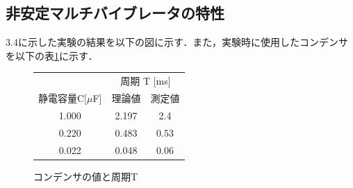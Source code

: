 \documentclass[10pt, a4j, dvipdfmx]{jarticle}
\makeatletter
\newcommand{\tblcaption}[1]{\def\@captype{table}\caption{#1}}
\makeatother
\begin{document}
\newpage
\subsection{非安定マルチバイブレータの特性}
3.4に示した実験の結果を以下の図に示す．また，実験時に使用したコンデンサを以下の表\ref{tbl:3.4-C}に示す．

\begin{figure}[H]
	\centering
	\tblcaption{コンデンサの値と周期T}
	\label{tbl:3.4-C}
	\begin{tabular}{|c|c|c|}\hline
		& \multicolumn{2}{|c|}{周期 T [ms]}  \\\cline{2-3}
		静電容量C[$\mu$F] & 理論値 & 測定値 \\\hline
		1.000 & 2.197 & 2.4 \\\hline
		0.220 & 0.483 & 0.53 \\\hline
		0.022 & 0.048 & 0.06 \\\hline
	\end{tabular}
\end{figure}
\end{document}

